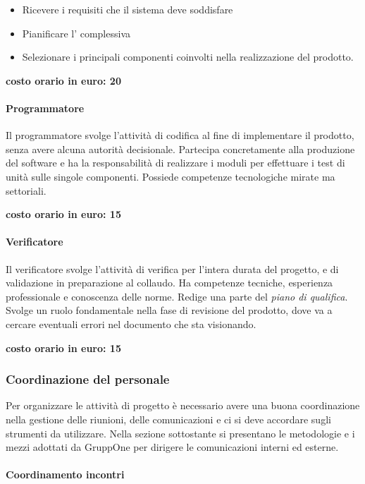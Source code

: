 \documentclass[../norme-di-progetto.tex]{subfiles}
\begin{document}
\begin{itemize}
  \item Ricevere i requisiti che il sistema deve soddisfare
  \item Pianificare l' complessiva
  \item Selezionare i principali componenti coinvolti nella realizzazione del prodotto.
\end{itemize}

\textbf{costo orario in euro: 20}

\paragraph{Programmatore}%
\label{par:programmatore}
Il programmatore svolge l'attività di codifica al fine di implementare il prodotto, senza avere alcuna autorità decisionale.
Partecipa concretamente alla produzione del software e ha la responsabilità di realizzare i moduli per effettuare i test di unità sulle singole componenti.
Possiede competenze tecnologiche mirate ma settoriali.

\textbf{costo orario in euro: 15}

\paragraph{Verificatore}%
\label{par:verificatore}
Il verificatore svolge l'attività di verifica per l'intera durata del progetto, e di validazione in preparazione al collaudo.
Ha competenze tecniche, esperienza professionale e conoscenza delle norme. Redige una parte del \textit{piano di qualifica}.
Svolge un ruolo fondamentale nella fase di revisione del prodotto, dove va a cercare eventuali errori nel documento che sta visionando.

\textbf{costo orario in euro: 15}

\subsubsection{Coordinazione del personale}%
\label{subs:coordinazione_del_personale}
Per organizzare le attività di progetto è necessario avere una buona coordinazione nella gestione delle riunioni, delle comunicazioni e ci si deve accordare sugli strumenti da utilizzare.
Nella sezione sottostante si presentano le metodologie e i mezzi adottati da GruppOne per dirigere le comunicazioni interni ed esterne.

\paragraph{Coordinamento incontri}%
\label{par:coordinamento_incontri}
\end{document}
